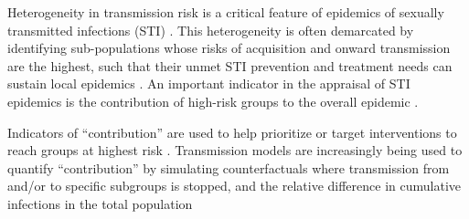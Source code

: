 Heterogeneity in transmission risk is a critical feature of
epidemics of sexually transmitted infections (STI) \citep{Anderson1991}.
This heterogeneity is often demarcated by identifying
sub-populations whose risks of acquisition and onward transmission are the highest,
such that their unmet STI prevention and treatment needs
can sustain local epidemics \citep{Yorke1978}.
An important indicator in the appraisal of STI epidemics is
the contribution of high-risk groups to the overall epidemic \citep{Case2012}.
\par
Indicators of ``contribution'' are used to help prioritize or target interventions
to reach groups at highest risk \citep{Case2012,Shubber2014}.
Transmission models are increasingly being used to quantify
``contribution'' by simulating counterfactuals where transmission 
from and/or to specific subgroups is stopped, and 
the relative difference in cumulative infections in the total population
